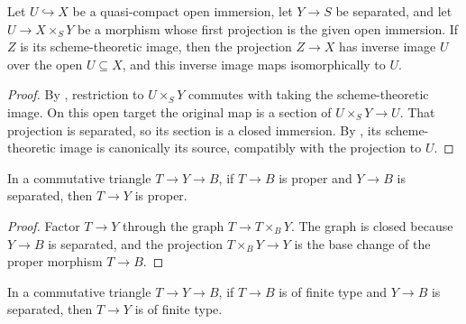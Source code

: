 \begin{lemma}
  \label{lemma:nagata-scheme-image-partial-section}

  Let \(U\hookrightarrow X\) be a quasi-compact open immersion, let
  \(Y\to S\) be separated, and let
  \(U\to X\times_SY\) be a morphism whose first projection is the given open
  immersion.  If \(Z\) is its scheme-theoretic image, then the projection
  \(Z\to X\) has inverse image \(U\) over the open \(U\subseteq X\), and this
  inverse image maps isomorphically to \(U\).
\end{lemma}

\begin{proof}
  By , restriction to
  \(U\times_SY\) commutes with taking the scheme-theoretic image.  On this
  open target the original map is a section of
  \(U\times_SY\to U\).  That projection is separated, so its section is a
  closed immersion.  By
  , its
  scheme-theoretic image is canonically its source, compatibly with the
  projection to $U$.
\end{proof}

\begin{lemma}
  \label{lemma:nagata-proper-to-separated-target}

  In a commutative triangle $T\to Y\to B$, if $T\to B$ is proper and
  $Y\to B$ is separated, then $T\to Y$ is proper.
\end{lemma}

\begin{proof}
  Factor $T\to Y$ through the graph
  $T\to T\times_BY$.  The graph is closed because $Y\to B$ is separated, and
  the projection $T\times_BY\to Y$ is the base change of the proper morphism
  $T\to B$.
\end{proof}

\begin{lemma}
  \label{lemma:nagata-finite-type-to-separated-target}

  In a commutative triangle \(T\to Y\to B\), if \(T\to B\) is of finite
  type and \(Y\to B\) is separated, then \(T\to Y\) is of finite type.
\end{lemma}

